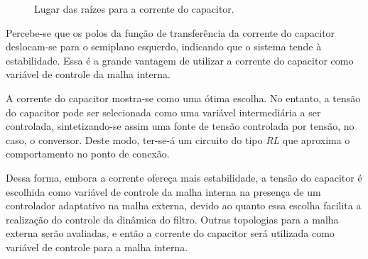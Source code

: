     \begin{figure}[htb]
        \renewcommand\figurename{Fig.}
        \caption{Lugar das raízes para a corrente do capacitor.}
        \label{fig:rlocus_ic}
    \end{figure}

    Percebe-se que os polos da função de transferência da corrente do capacitor
    deslocam-se para o semiplano esquerdo, indicando que o sistema tende à
    estabilidade. Essa é a grande vantagem de utilizar a corrente do capacitor
    como variável de controle da malha interna.

    A corrente do capacitor mostra-se como uma ótima escolha. No entanto, a tensão
    do capacitor pode ser selecionada como uma variável intermediária a ser controlada,
    sintetizando-se assim uma fonte de tensão controlada por tensão, no caso, o
    conversor. Deste modo, ter-se-á um circuito do tipo \emph{RL} que aproxima o
    comportamento no ponto de conexão.

    Dessa forma, embora a corrente ofereça mais estabilidade, a tensão do capacitor
    é escolhida como variável de controle da malha interna na presença de um controlador
    adaptativo na malha externa, devido ao quanto essa escolha facilita a realização do
    controle da dinâmica do filtro. Outras topologias para a malha externa serão
    avaliadas, e então a corrente do capacitor será utilizada como variável de
    controle para a malha interna.


